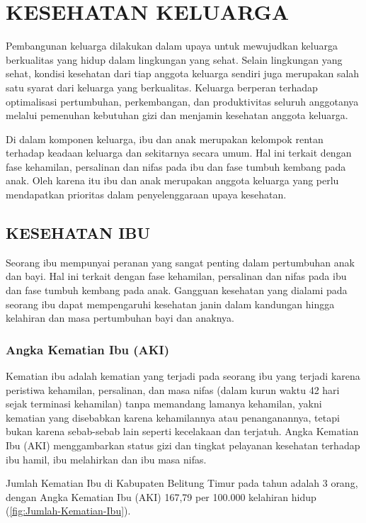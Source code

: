\chapter{KESEHATAN KELUARGA}
Pembangunan keluarga dilakukan dalam upaya untuk mewujudkan keluarga berkualitas yang hidup dalam lingkungan yang sehat. Selain lingkungan yang sehat, kondisi kesehatan dari tiap anggota keluarga sendiri juga merupakan salah satu syarat dari keluarga yang berkualitas.
Keluarga berperan terhadap optimalisasi pertumbuhan, perkembangan, dan produktivitas seluruh anggotanya melalui pemenuhan kebutuhan gizi dan menjamin kesehatan anggota keluarga. 

Di dalam komponen keluarga, ibu dan anak merupakan kelompok rentan terhadap keadaan keluarga dan sekitarnya secara umum.
Hal ini terkait dengan fase kehamilan, persalinan dan nifas pada ibu dan fase tumbuh kembang pada anak.
Oleh karena itu ibu dan anak merupakan anggota keluarga yang perlu mendapatkan prioritas dalam penyelenggaraan upaya kesehatan.

\section{KESEHATAN IBU}
Seorang ibu mempunyai peranan yang sangat penting dalam pertumbuhan anak dan bayi.
Hal ini terkait dengan fase kehamilan, persalinan dan nifas pada ibu dan fase tumbuh kembang pada anak.
Gangguan kesehatan yang dialami pada seorang ibu dapat mempengaruhi kesehatan janin dalam kandungan hingga kelahiran dan masa pertumbuhan bayi dan anaknya.

\subsection{Angka Kematian Ibu (AKI)}
Kematian ibu adalah kematian yang terjadi pada seorang ibu yang terjadi karena peristiwa kehamilan, persalinan, dan masa nifas (dalam kurun waktu 42 hari sejak terminasi kehamilan) tanpa memandang lamanya kehamilan, yakni kematian yang disebabkan karena kehamilannya atau penanganannya, tetapi bukan karena sebab-sebab lain seperti kecelakaan dan terjatuh.
Angka Kematian Ibu (AKI) menggambarkan status gizi dan tingkat pelayanan kesehatan terhadap ibu hamil, ibu melahirkan dan ibu masa nifas.

Jumlah Kematian Ibu di Kabupaten Belitung Timur pada tahun \tP adalah 3 orang, dengan Angka Kematian Ibu (AKI) 167,79 per 100.000 kelahiran hidup (\autoref{fig:Jumlah-Kematian-Ibu}). 

